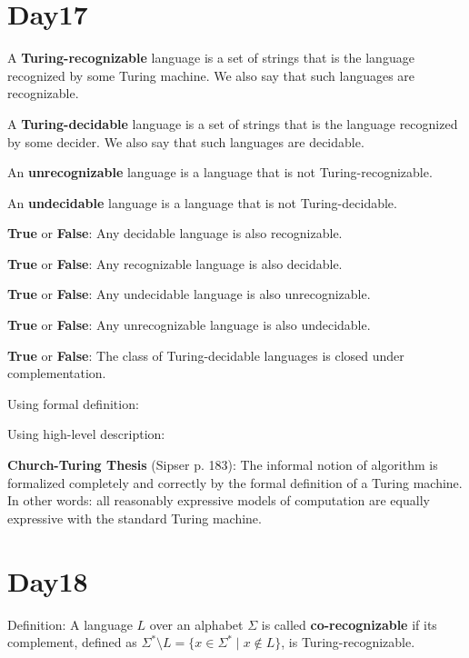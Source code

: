 \documentclass[12pt, oneside]{article}
\begin{document}
 \vfill
\section*{Day17}




A {\bf Turing-recognizable} language is a set of strings that 
is the language recognized by some Turing machine. We also 
say that such languages are recognizable.

A {\bf Turing-decidable} language is a set of strings that 
is the language recognized by some decider. We also 
say that such languages are decidable.


An {\bf unrecognizable} language is a language that is not Turing-recognizable.

An {\bf undecidable} language is a language that is not Turing-decidable.

\vfill

{\bf  True} or {\bf False}: Any  decidable language  is  also  recognizable.

\vfill

{\bf  True} or {\bf False}: Any  recognizable language  is  also  decidable.

\vfill

{\bf  True} or {\bf False}: Any  undecidable language  is  also  unrecognizable.

\vfill

{\bf  True} or {\bf False}: Any  unrecognizable language  is  also  undecidable.

\vfill

\newpage


{\bf True} or {\bf False}: The class of Turing-decidable languages is closed under complementation.

\vfill

Using formal definition:
\vfill

Using high-level description:
\vfill


{\bf  Church-Turing Thesis} (Sipser p. 183): The informal notion of algorithm is formalized completely  and correctly by the 
formal definition of a  Turing machine. In other words: all reasonably expressive models of 
computation are equally expressive with the standard Turing machine.
 \vfill
\section*{Day18}



Definition: A language $L$ over an  alphabet $\Sigma$ is called {\bf co-recognizable} if its complement,  defined
as $\Sigma^* \setminus L  = \{ x  \in  \Sigma^* \mid x \notin  L \}$, is Turing-recognizable.
\end{document}
